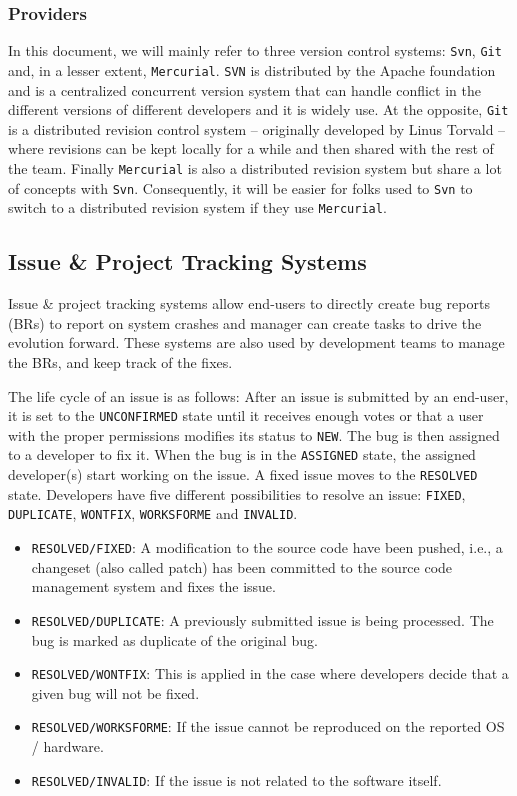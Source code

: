 \subsubsection{Providers\label{sec:revision-provider}}

In this document, we will mainly refer to three version control systems: {\tt Svn}, {\tt Git} and, in a lesser extent, {\tt Mercurial}. {\tt SVN} is distributed by the Apache foundation and is a centralized concurrent version system that can handle conflict in the different versions of different developers and it is widely use.
At the opposite, {\tt Git} is a distributed revision control system -- originally developed by Linus Torvald -- where revisions can be kept locally for a while and then shared with the rest of the team.
Finally {\tt Mercurial} is also a distributed revision system but share a lot of concepts with {\tt Svn}.
Consequently, it will be easier for folks used to {\tt Svn} to switch to a distributed revision system if they use {\tt Mercurial}.

\subsection{Issue \& Project Tracking Systems\label{sec:issue-tracking}}

Issue \& project tracking systems allow end-users to directly create bug reports (BRs) to report on system crashes and manager can create tasks to drive the evolution forward.
These systems are also used by development teams to manage the BRs, and keep track of the fixes.

The life cycle of an issue is as follows: After an issue is submitted by an end-user, it is set to the {\tt UNCONFIRMED} state until it receives enough votes or that a user with the proper permissions modifies its status to {\tt NEW}.
The bug is then assigned to a developer to fix it.
When the bug is in the {\tt ASSIGNED} state, the assigned developer(s) start working on the issue.
A fixed issue moves to the {\tt RESOLVED} state. Developers have five different possibilities to resolve an issue: {\tt FIXED}, {\tt DUPLICATE}, {\tt WONTFIX}, {\tt WORKSFORME} and {\tt INVALID}.

\begin{itemize}
	\item {\tt RESOLVED/FIXED}: A modification to the source code have been pushed, i.e., a changeset (also called patch) has been committed to the source code management system and fixes the issue.
	\item {\tt RESOLVED/DUPLICATE}: A previously submitted issue is being processed. The bug is marked as duplicate of the original bug.
	\item {\tt RESOLVED/WONTFIX}: This is applied in the case where developers decide that a given bug will not be fixed.
	\item {\tt RESOLVED/WORKSFORME}: If the issue cannot be reproduced on the reported OS / hardware.
	\item {\tt RESOLVED/INVALID}: If the issue is not related to the software itself.
\end{itemize}

